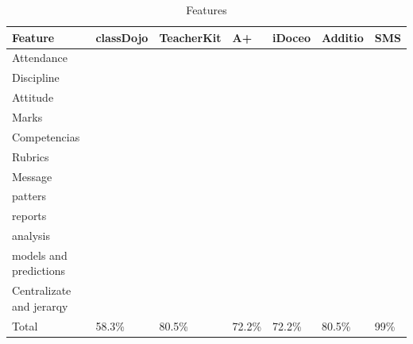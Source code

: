 \documentclass[oneside,english,titlepage]{scrbook}
\newcommand{\completeValue}{\textcolor{ownGreen}{\ding{51}}}
\newcommand{\noneValue}{\textcolor{ownRed}{\ding{55}}}
\newcommand{\partialValue}{\textcolor{ownOrange}{\ding{120}}}
\begin{document}
\begin{table}[]
\centering

\begin{tabular}{@{}lllllll@{}}

Feature & classDojo & TeacherKit & A+ & iDoceo & Additio & SMS \\ \midrule

Attendance & \completeValue & \completeValue & \completeValue & \completeValue & \completeValue & \completeValue \\

Discipline & \partialValue & \completeValue & \completeValue & \completeValue & \completeValue & \completeValue \\

Attitude & \partialValue & \completeValue & \completeValue & \completeValue & \completeValue & \completeValue \\

Marks & \noneValue & \completeValue & \completeValue & \completeValue & \completeValue & \completeValue \\

Competencias & \noneValue & \noneValue & \noneValue & \completeValue & \completeValue & \completeValue \\

Rubrics & \noneValue & \noneValue & \noneValue & \completeValue & \completeValue & \completeValue \\

Message & \completeValue & \completeValue & \completeValue & \noneValue & \noneValue &	\completeValue \\

patters & \noneValue & \noneValue & \noneValue & \completeValue & \completeValue & \completeValue \\

reports & \noneValue & \completeValue & \completeValue & \partialValue & \completeValue & \completeValue \\

analysis & \partialValue & \completeValue & \partialValue & \partialValue & \partialValue & \completeValue \\

models and predictions & \noneValue & \noneValue & \noneValue & \noneValue & \noneValue & \completeValue \\

Centralizate and jerarqy & \noneValue & \partialValue & \noneValue & \noneValue & \noneValue & \completeValue \\ \midrule

Total & 58.3\% & 80.5\% & 72.2\% & 	72.2\% & 80.5\% & 99\% \\
\end{tabular}
\caption{Features}
\label{my-label}
\end{table}
\end{document}
